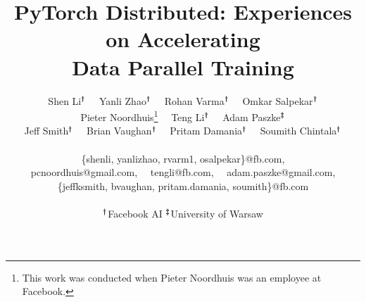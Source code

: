 \documentclass{vldb}
\begin{document}

\title{PyTorch Distributed: Experiences on Accelerating \\ Data Parallel Training}

\author{Shen Li$^{\textbf{\dag}}$ \ \ Yanli Zhao$^{\textbf{\dag}}$ \ \ Rohan Varma$^{\textbf{\dag}}$ \ \ Omkar Salpekar$^{\textbf{\dag}}$ \\ Pieter Noordhuis\thanks{This work was conducted when Pieter Noordhuis was an employee at Facebook.} \ \ Teng Li$^{\textbf{\dag}}$ \ \ Adam Paszke$^{\textbf{\ddag}}$ \\ Jeff Smith$^{\textbf{\dag}}$ \ \ Brian Vaughan$^{\textbf{\dag}}$ \ \ Pritam Damania$^{\textbf{\dag}}$ \ \ Soumith Chintala$^{\textbf{\dag}}$ \\ \\
\{shenli, yanlizhao, rvarm1, osalpekar\}@fb.com, \\ pcnoordhuis@gmail.com, \ \ tengli@fb.com, \ \  adam.paszke@gmail.com, \\ \{jeffksmith, bvaughan, pritam.damania, soumith\}@fb.com \\ \\
$^{\textbf{\dag}}$Facebook AI \qquad \qquad $^{\textbf{\ddag}}$University of Warsaw}

\maketitle



\newpage













\par\leavevmode
\end{document}
